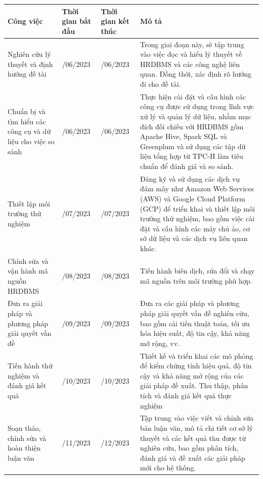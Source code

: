 \documentclass{article}[14pt]
\begin{document}
{\begin{longtable}{|>{\raggedright\arraybackslash}p{4cm}|>{\raggedright\arraybackslash}p{3cm}|>{\raggedright\arraybackslash}p{3cm}|>{\raggedright\arraybackslash}p{5cm}|}
\hline
\textbf{Công việc} & \textbf{Thời gian bắt đầu} & \textbf{Thời gian kết thúc} & \textbf{Mô tả} \\
\hline
Nghiên cứu lý thuyết và định hướng đề tài & 01/06/2023 & 15/06/2023 & Trong giai đoạn này, sẽ tập trung vào việc đọc và hiểu lý thuyết về HRDBMS và các công nghệ liên quan. Đồng thời, xác định rõ hướng đi cho đề tài. \\
\hline
Chuẩn bị và tìm hiểu các công cụ và dữ liệu cho việc so sánh & 16/06/2023 & 30/06/2023 & Thực hiện cài đặt và cấu hình các công cụ được sử dụng trong lĩnh vực xử lý và quản lý dữ liệu, nhằm mục đích đối chiếu với HRDBMS gồm Apache Hive, Spark SQL và Greenplum và sử dụng các tập dữ liệu tổng hợp từ TPC-H làm tiêu chuẩn để đánh giá và so sánh. \\
\hline
Thiết lập môi trường thử nghiệm & 01/07/2023 & 15/07/2023 & Đăng ký và sử dụng các dịch vụ đám mây như Amazon Web Services (AWS) và Google Cloud Platform (GCP) để triển khai và thiết lập môi trường thử nghiệm, bao gồm việc cài đặt và cấu hình các máy chủ ảo, cơ sở dữ liệu và các dịch vụ liên quan khác. \\
\hline
Chỉnh sửa và vận hành mã nguồn HRDBMS & 01/08/2023 & 31/08/2023 & Tiến hành biên dịch, sửa đổi và chạy mã nguồn trên môi trường phù hợp. \\
\hline
Đưa ra giải pháp và phương pháp giải quyết vấn đề & 01/09/2023 & 30/09/2023 & Đưa ra các giải pháp và phương pháp giải quyết vấn đề nghiên cứu, bao gồm cải tiến thuật toán, tối ưu hóa hiệu suất, độ tin cậy, khả năng mở rộng, vv. \\
\hline
Tiến hành thử nghiệm và đánh giá kết quả & 01/10/2023 & 31/10/2023 & Thiết kế và triển khai các mô phỏng để kiểm chứng tính hiệu quả, độ tin cậy và khả năng mở rộng của các giải pháp đề xuất. Thu thập, phân tích và đánh giá kết quả thực nghiệm \\
\hline
Soạn thảo, chỉnh sửa và hoàn thiện luận văn & 01/11/2023 & 01/12/2023 & Tập trung vào việc viết và chỉnh sửa bản luận văn, mô tả chi tiết cơ sở lý thuyết và các kết quả thu được từ nghiên cứu, bao gồm phân tích, đánh giá và đề xuất các giải pháp mới cho hệ thống. \\
\hline
\end{longtable}


    





}
\end{document}
